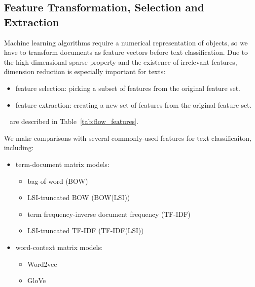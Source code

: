 \subsection{Feature Transformation, Selection and Extraction}
Machine learning algorithms require a numerical representation of objects, so we have to transform documents as feature vectors before text classification. Due to the high-dimensional sparse property and the existence of irrelevant features, dimension reduction is especially important for texts\cite{aggarwal2012tc}:
\begin{itemize}
\item feature selection: picking a subset of features from the original feature set.
\item feature extraction: creating a new set of features from the original feature set.
\end{itemize}
~\newline
{} are described in Table~\ref{tab:flow_features}.
\par We make comparisons with several commonly-used features for text classificaiton, including:
\begin{itemize}
\item term-document matrix models:
	\begin{itemize}
	\item bag-of-word (BOW)
	\item LSI\cite{deerwester1990lsi}-truncated BOW (BOW(LSI))
	\item term frequency-inverse document frequency (TF-IDF)
	\item LSI-truncated TF-IDF (TF-IDF(LSI))
	\end{itemize}
\item word-context matrix models:
	\begin{itemize}
	\item Word2vec\cite{mikolov2013word2vec}
	\item GloVe\cite{pennington2014glove}
	\end{itemize}
\end{itemize}


